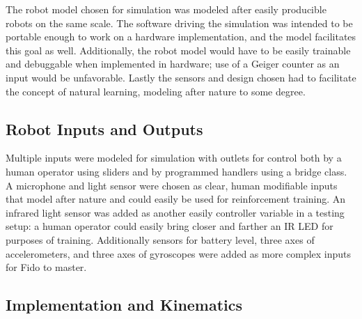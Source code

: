 The robot model chosen for simulation was modeled after easily producible robots on the same scale.  The software driving the simulation was intended to be portable enough to work on a hardware implementation, and the model facilitates this goal as well.  Additionally, the robot model would have to be easily trainable and debuggable when implemented in hardware; use of a Geiger counter as an input would be unfavorable.  Lastly the sensors and design chosen had to facilitate the concept of natural learning, modeling after nature to some degree.

\subsection{Robot Inputs and Outputs}

Multiple inputs were modeled for simulation with outlets for control both by a human operator using sliders and by programmed handlers using a bridge class.  A microphone and light sensor were chosen as clear, human modifiable inputs that model after nature and could easily be used for reinforcement training.  An infrared light sensor was added as another easily controller variable in a testing setup: a human operator could easily bring closer and farther an IR LED for purposes of training.   Additionally sensors for battery level, three axes of accelerometers, and three axes of gyroscopes were added as more complex inputs for Fido to master.  


\subsection{Implementation and Kinematics}